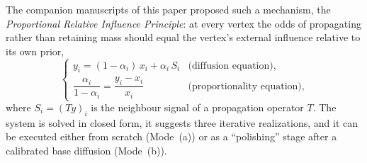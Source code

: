 \documentclass[11pt,a4paper]{article}
\theoremstyle{definition}
\theoremstyle{plain}
\begin{document}
The companion manuscripts of this paper proposed such a mechanism, the \emph{Proportional Relative Influence Principle}: at every vertex the odds of propagating rather than retaining mass should equal the vertex's external influence relative to its own prior,
\begin{equation}\label{eq:system}
\begin{cases}
y_i=(1-\alpha_i)\,x_i+\alpha_i\,S_i & \text{(diffusion equation)},\\[3pt]
\dfrac{\alpha_i}{1-\alpha_i}=\dfrac{y_i-x_i}{x_i} & \text{(proportionality equation)},
\end{cases}
\end{equation}
where $S_i=(Ty)_i$ is the neighbour signal of a propagation operator $T$. The system is solved in closed form, it suggests three iterative realizations, and it can be executed either from scratch (Mode~(a)) or as a ``polishing'' stage after a calibrated base diffusion (Mode~(b)).
\end{document}

